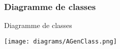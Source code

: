 
\begin{frame}
    \frametitle{Diagramme de classes}
    \begin{block}{Diagramme de classes}
        \begin{center}
            \texttt{[image: diagrams/AGenClass.png]}
        \end{center}
    \end{block}
\end{frame}
